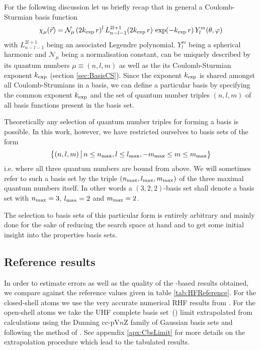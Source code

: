 \newcommand{\nmax}{\ensuremath n_\text{max}}
\newcommand{\lmax}{\ensuremath l_\text{max}}
\newcommand{\mmax}{\ensuremath m_\text{max}}
For the following discussion let us briefly recap
that in general a Coulomb-Sturmian basis function
\begin{equation}
\chi_\mu(\vec{r}) = \mathcal{N}_\mu \,
	(2 k_\text{exp} \, r)^l \,
	L^{2l+1}_{n-l-1}(2 k_\text{exp} \, r) \,
	\exp(- k_\text{exp} \, r) \,
	Y_l^m(\theta, \varphi)
	\label{eqn:FormCSBasisFunction}
\end{equation}
with $L^{2l+1}_{n-l-1}$ being an associated Legendre polynomial,
$Y_l^m$ being a spherical harmonic and $\mathcal{N}_\mu$ being a normalisation
constant,
can be uniquely described by its quantum numbers $\mu \equiv (n,l,m)$
as well as the its Coulomb-Sturmian exponent $k_\text{exp}$ (\cf section \vref{sec:BasisCS}).
Since the exponent $k_\text{exp}$ is shared amongst all Coulomb-Strumians in a basis,
we can define a particular \CS basis
by specifying the common exponent $k_\text{exp}$
and the set of quantum number triples $(n, l, m)$ of all \CS basis functions
present in the basis set.

Theoretically any selection of quantum number triples for forming a basis
is possible.
In this work, however, we have restricted ourselves to basis sets of the form
\[ \big\{ (n, l, m) \, \big| \, n \le \nmax, l \le \lmax, -\mmax \le m \le \mmax \big\} \]
i.e. where all three quantum numbers are bound from above.
We will sometimes refer to such a \CS basis set by the triple
$(\nmax, \lmax, \mmax)$ of the three maximal quantum numbers itself.
In other words a $(3,2,2)$-basis set shall denote a basis set with
$\nmax = 3$, $\lmax = 2$ and $\mmax = 2$.

The selection to basis sets of this particular form is entirely arbitrary
and mainly done for the sake of reducing the search space at hand
and to get some initial insight into the properties \CS basis sets.

\subsection{Reference results}
\defineabbr{CBS}{CBS\xspace}{complete basis set limit}

In order to estimate errors as well as the quality of the \CS-based \HF
results obtained,
we compare against the reference values given in table \vref{tab:HFReference}.
For the closed-shell atoms we use the very accurate numerical RHF results
from \citet{Morgon1997}.
For the open-shell atoms we take the UHF complete basis set~(\CBS)
limit extrapolated from calculations using the Dunning cc-pV$n$Z family
of Gaussian basis sets and following the method of \citet{Jensen2005}.
See appendix \vref{apx:CbsLimit} for more details on the extrapolation
procedure which lead to the tabulated results.



